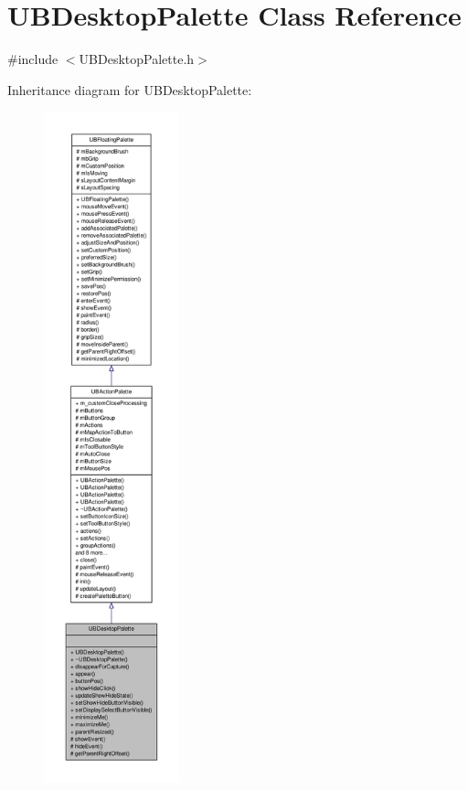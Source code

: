\hypertarget{class_u_b_desktop_palette}{\section{U\-B\-Desktop\-Palette Class Reference}
\label{d7/dfa/class_u_b_desktop_palette}
}


{\ttfamily \#include $<$U\-B\-Desktop\-Palette.\-h$>$}



Inheritance diagram for U\-B\-Desktop\-Palette\-:
\nopagebreak
\begin{figure}[H]
\begin{center}
\leavevmode
\includegraphics[height=550pt]{df/d58/class_u_b_desktop_palette__inherit__graph}
\end{center}
\end{figure}


